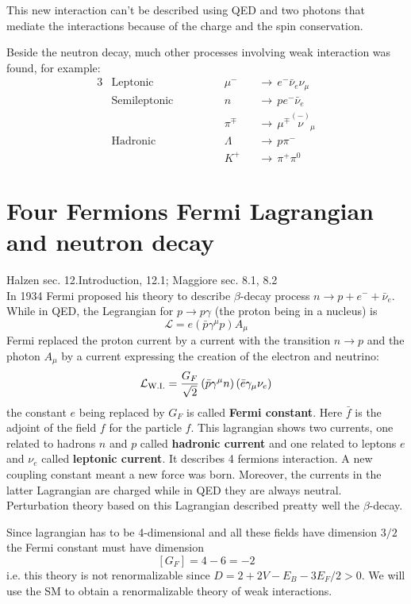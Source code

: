\documentclass[TheoreticalPhy_ModB.tex]{subfiles}
\begin{document}
This new interaction can't be described using QED and two photons that mediate the interactions because of the charge and the spin conservation. 

Beside the neutron decay, much other processes involving weak interaction was found, for example:
\begin{alignat*}{3}
&\text{Leptonic}\hspace{2cm}
&&\mu^-&&\to\, e^-\bar\nu_e\nu_\mu\\
&\text{Semileptonic}
&&n&&\to\, pe^-\bar\nu_e\\
&&&\pi^\mp&&\to\,\mu^\mp\overset{(-)}{\nu}_\mu\\
&\text{Hadronic}
&&\Lambda&&\to\, p\pi^-\\
&&&K^+&&\to\,\pi^+\pi^0
\end{alignat*}

\section{Four Fermions Fermi Lagrangian and neutron decay}
\textsf{Halzen sec. 12.Introduction, 12.1; Maggiore sec. 8.1, 8.2}\\

In 1934 Fermi proposed his theory to describe $\beta$-decay process $n\to p+e^-+\bar \nu_e$. While in QED, the Legrangian for $p\to p\gamma$ (the proton being in a nucleus) is
\[\mathcal L=e(\bar p\gamma^\mu p)A_\mu\]
Fermi replaced the proton current by a current with the transition $n\to p$ and the photon $A_\mu$ by a current expressing the creation of the electron and neutrino:
\[\mathcal L_{\text{W.I.}}=\frac{G_F}{\sqrt 2}\left(\bar p\gamma^\mu n\right)\left(\bar e \gamma_\mu\nu_e\right)\]
the constant $e$ being replaced by $G_F$ is called \textbf{Fermi constant}. Here $\bar f$ is the adjoint of the field $f$ for the particle $f$. This lagrangian shows two currents, one related to hadrons $n$ and $p$ called \textbf{hadronic current} and one related to leptons $e$ and $\nu_e$ called \textbf{leptonic current}. It describes 4 fermions interaction. A new coupling constant meant a new force was born. Moreover, the currents in the latter Lagrangian are charged while in QED they are always neutral. Perturbation theory based on this Lagrangian described preatty well the $\beta$-decay.

Since lagrangian has to be 4-dimensional and all these fields have dimension $3/2$ the Fermi constant must have dimension
\[[G_F]=4-6=-2\]
i.e. this theory is not renormalizable since $D=2+2V-E_B-3E_F/2>0$. We will use the SM to obtain a renormalizable theory of weak interactions. 
\end{document}
